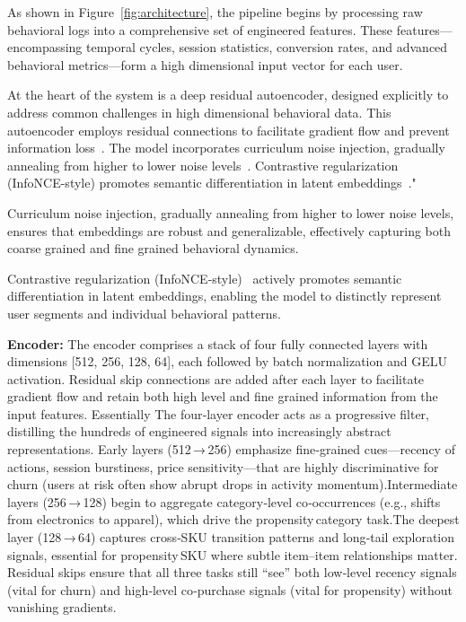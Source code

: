 \documentclass[sigconf]{acmart}
\begin{document}
As shown in Figure~\ref{fig:architecture}, the pipeline begins by processing raw behavioral logs into a comprehensive set of engineered features. These features—encompassing temporal cycles, session statistics, conversion rates, and advanced behavioral metrics—form a high dimensional input vector for each user.

At the heart of the system is a deep residual autoencoder, designed explicitly to address common challenges in high dimensional behavioral data. This autoencoder employs residual connections to facilitate gradient flow and prevent information loss~\cite{He2016ResNet,Mao2016}. The model incorporates curriculum noise injection, gradually annealing from higher to lower noise levels~\cite{Bengio2009Curriculum,Sajjadi2016NoiseAnneal}. Contrastive regularization (InfoNCE-style) promotes semantic differentiation in latent embeddings~\cite{Oord2018,Zhou2020S3Rec}."

Curriculum noise injection, gradually annealing from higher to lower noise levels, ensures that embeddings are robust and generalizable, effectively capturing both coarse grained and fine grained behavioral dynamics.

Contrastive regularization (InfoNCE-style)~\cite{Oord2018} actively promotes semantic differentiation in latent embeddings, enabling the model to distinctly represent user segments and individual behavioral patterns.

\textbf{Encoder:}  
The encoder comprises a stack of four fully connected layers with dimensions [512, 256, 128, 64], each followed by batch normalization and GELU activation. Residual skip connections are added after each layer to facilitate gradient flow and retain both high level and fine grained information from the input features. Essentially The four‐layer encoder acts as a progressive filter, distilling the hundreds of engineered signals into increasingly abstract representations.
Early layers (512 → 256) emphasize fine‑grained cues—recency of actions, session burstiness, price sensitivity—that are highly discriminative for churn (users at risk often show abrupt drops in activity momentum).Intermediate layers (256 → 128) begin to aggregate category‑level co‑occurrences (e.g., shifts from electronics to apparel), which drive the propensity category task.The deepest layer (128 → 64) captures cross‑SKU transition patterns and long‑tail exploration signals, essential for propensity SKU where subtle item–item relationships matter.
Residual skips ensure that all three tasks still “see” both low‑level recency signals (vital for churn) and high‑level co‑purchase signals (vital for propensity) without vanishing gradients.
\end{document}

